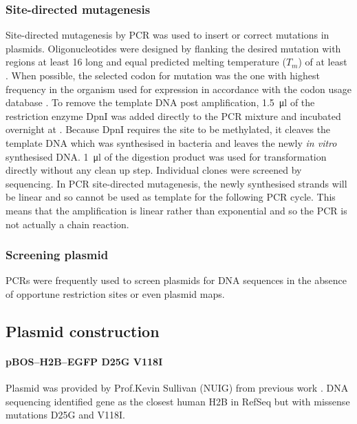       \subsubsection{Site-directed mutagenesis}
        Site-directed mutagenesis by PCR was used to insert or correct
        mutations in plasmids.
        Oligonucleotides were designed by flanking the
        desired mutation with regions at least \SI{16}{\bp} long
        and equal predicted melting temperature ($T_m$) of at least .
        When possible, the selected codon for mutation was the one
        with highest frequency in the organism used for expression
        in accordance with the
        codon usage database \citep{codon_usage}.
        To remove the template DNA post amplification, \SI{1.5}{\ul} of the
        restriction enzyme DpnI was added directly to the PCR mixture
        and incubated overnight at .
        Because DpnI requires the site to be methylated, it
        cleaves the template DNA which was synthesised in
        bacteria and leaves the newly \textit{in vitro}
        synthesised DNA.
        \SI{1}{\ul} of the digestion product was used for
        transformation directly without any clean up step.
        Individual clones were screened by sequencing.
        In PCR site-directed mutagenesis, the newly synthesised
        strands will be linear and so cannot be used as template for
        the following PCR cycle.
        This means that the amplification is linear rather than
        exponential and so the PCR is not actually a chain reaction.

      \subsubsection{Screening plasmid}
        PCRs were frequently used to screen plasmids for DNA sequences
        in the absence of opportune restriction sites or even plasmid maps.

    \subsection{Plasmid construction}

      \paragraph{pBOS--H2B--EGFP D25G V118I}
      Plasmid was provided by Prof.\@ Kevin Sullivan (NUIG) from
      previous work \citep{KevinH2BGFP}.  DNA sequencing identified
      gene  as the closest human H2B in RefSeq but
      with missense mutations D25G and V118I.

